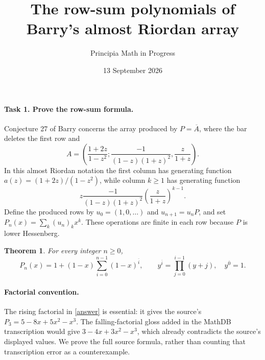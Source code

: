 \documentclass[10pt]{article}
\title{The row-sum polynomials of Barry's almost Riordan array}
\author{Principia Math in Progress}
\date{13 September 2026}
\newtheorem{theorem}{Theorem}
\begin{document}
\maketitle

\paragraph{Task 1. Prove the row-sum formula.}
Conjecture 27 of Barry \cite{Barry} concerns the array produced by
\(P=\overline A\), where the bar deletes the first row and
\[
 A=\left(\frac{1+2z}{1-z^2};
          \frac{-1}{(1-z)(1+z)^2},\frac{z}{1+z}\right).
\]
In this almost Riordan notation the first column has generating
function \(a(z)=(1+2z)/(1-z^2)\), while column \(k\ge1\) has
generating function
\[
 z\frac{-1}{(1-z)(1+z)^2}\left(\frac{z}{1+z}\right)^{k-1}.
\]
Define the produced rows by \(u_0=(1,0,\ldots)\) and
\(u_{n+1}=u_nP\), and set \(P_n(x)=\sum_k(u_n)_kx^k\).
These operations are finite in each row because \(P\) is lower
Hessenberg.

\begin{theorem}
For every integer \(n\ge0\),
\begin{equation}\label{answer}
 P_n(x)=1+(1-x)\sum_{i=0}^{n-1}(1-x)^{\overline i},
 \qquad y^{\overline i}=\prod_{j=0}^{i-1}(y+j),
 \quad y^{\overline0}=1.
\end{equation}
\end{theorem}

\paragraph{Factorial convention.}
The rising factorial in \eqref{answer} is essential: it gives the
source's \(P_3=5-8x+5x^2-x^3\). The falling-factorial gloss added
in the MathDB transcription would give \(3-4x+3x^2-x^3\), which
already contradicts the source's displayed values. We prove the
full source formula, rather than counting that transcription
error as a counterexample.
\end{document}
